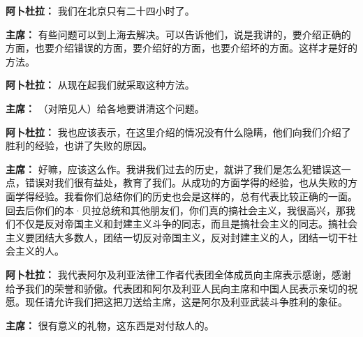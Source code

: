 \begin{duihua}
\item[\textbf{阿卜杜拉：}] 我们在北京只有二十四小时了。

\item[\textbf{主席：}] 有些问题可以到上海去解决。可以告诉他们，说是我讲的，要介绍正确的方面，也要介绍错误的方面，要介绍好的方面，也要介绍坏的方面。这样才是好的方法。

\item[\textbf{阿卜杜拉：}] 从现在起我们就采取这种方法。

\item[\textbf{主席：}] （对陪见人）给各地要讲清这个问题。

\item[\textbf{阿卜杜拉：}] 我也应该表示，在这里介绍的情况没有什么隐瞒，他们向我们介绍了胜利的经验，也讲了失败的原因。

\item[\textbf{主席：}] 好嘛，应该这么作。我讲我们过去的历史，就讲了我们是怎么犯错误这一点，错误对我们很有益处，教育了我们。从成功的方面学得的经验，也从失败的方面学得经验。我看你们总结你们的历史也会是这样的，总有代表比较正确的一面。回去后你们的本·贝拉总统和其他朋友们，你们真的搞社会主义，我很高兴，那我们不仅是反对帝国主义和封建主义斗争的同志，而且是搞社会主义的同志。搞社会主义要团结大多数人，团结一切反对帝国主义，反对封建主义的人，团结一切干社会主义的人。

\item[\textbf{阿卜杜拉：}] 我代表阿尔及利亚法律工作者代表团全体成员向主席表示感谢，感谢给予我们的荣誉和骄傲。代表团和阿尔及利亚人民向主席和中国人民表示亲切的祝愿。现任请允许我们把这把刀送给主席，这是阿尔及利亚武装斗争胜利的象征。

\item[\textbf{主席：}] 很有意义的礼物，这东西是对付敌人的。
\end{duihua}

